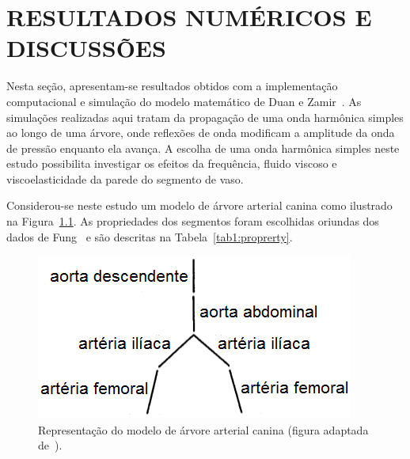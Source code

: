 \chapter{RESULTADOS NUMÉRICOS E DISCUSSÕES}\label{sec:resultados}


Nesta seção, apresentam-se resultados obtidos com a implementação computacional e simulação do modelo matemático de Duan e Zamir~\cite{Duan1992}. As simulações realizadas aqui tratam da propagação de uma onda harmônica simples ao longo de uma árvore, onde reflexões de onda modificam a amplitude da onda de pressão enquanto ela avança. A escolha de uma onda harmônica simples neste estudo possibilita investigar os efeitos da frequência, fluido viscoso e viscoelasticidade da parede do segmento de vaso.

Considerou-se neste estudo um modelo de árvore arterial canina como ilustrado na Figura~\ref{fig:arvore-canina}. As propriedades dos segmentos foram escolhidas oriundas dos dados de Fung~\cite{fung2013biomechanics} e são descritas na Tabela~\ref{tab1:proprerty}. 

\begin{figure}[!htbp]
	\centering
	\includegraphics[scale=0.8]{Figures/tree_canine.png}
	\caption{Representação do modelo de árvore arterial canina (figura adaptada de~\cite{Duan}).}
	\label{fig:arvore-canina}
\end{figure}


